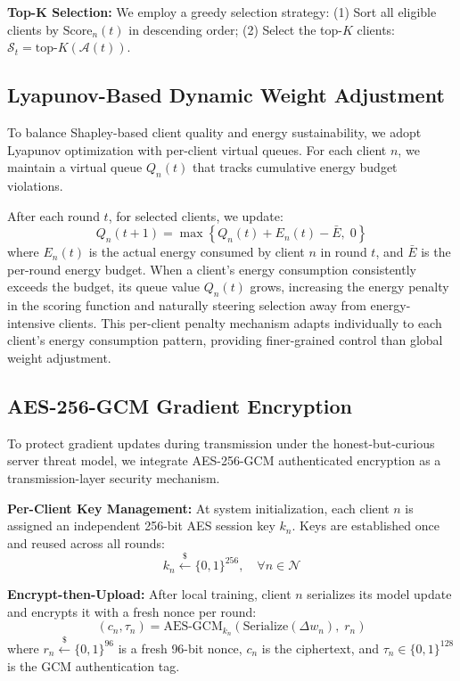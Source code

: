 \textbf{Top-K Selection:} We employ a greedy selection strategy: (1) Sort all eligible clients by $\text{Score}_n(t)$ in descending order; (2) Select the top-$K$ clients: $\mathcal{S}_t = \text{top-}K(\mathcal{A}(t))$.

\subsection{Lyapunov-Based Dynamic Weight Adjustment}

To balance Shapley-based client quality and energy sustainability, we adopt Lyapunov optimization with per-client virtual queues. For each client $n$, we maintain a virtual queue $Q_n(t)$ that tracks cumulative energy budget violations.

After each round $t$, for selected clients, we update:
\begin{equation}
Q_n(t+1) = \max\left\{Q_n(t) + E_n(t) - \bar{E}, \; 0\right\}
\end{equation}
where $E_n(t)$ is the actual energy consumed by client $n$ in round $t$, and $\bar{E}$ is the per-round energy budget. When a client's energy consumption consistently exceeds the budget, its queue value $Q_n(t)$ grows, increasing the energy penalty in the scoring function and naturally steering selection away from energy-intensive clients. This per-client penalty mechanism adapts individually to each client's energy consumption pattern, providing finer-grained control than global weight adjustment.

\subsection{AES-256-GCM Gradient Encryption}

To protect gradient updates during transmission under the honest-but-curious server threat model, we integrate AES-256-GCM authenticated encryption as a transmission-layer security mechanism.

\textbf{Per-Client Key Management:} At system initialization, each client $n$ is assigned an independent 256-bit AES session key $k_n$. Keys are established once and reused across all rounds:
\begin{equation}
k_n \xleftarrow{\$} \{0,1\}^{256}, \quad \forall n \in \mathcal{N}
\end{equation}

\textbf{Encrypt-then-Upload:} After local training, client $n$ serializes its model update and encrypts it with a fresh nonce per round:
\begin{equation}
(c_n, \tau_n) = \text{AES-GCM}_{k_n}\!\left(\text{Serialize}(\Delta w_n),\; r_n\right)
\end{equation}
where $r_n \xleftarrow{\$} \{0,1\}^{96}$ is a fresh 96-bit nonce, $c_n$ is the ciphertext, and $\tau_n \in \{0,1\}^{128}$ is the GCM authentication tag.

